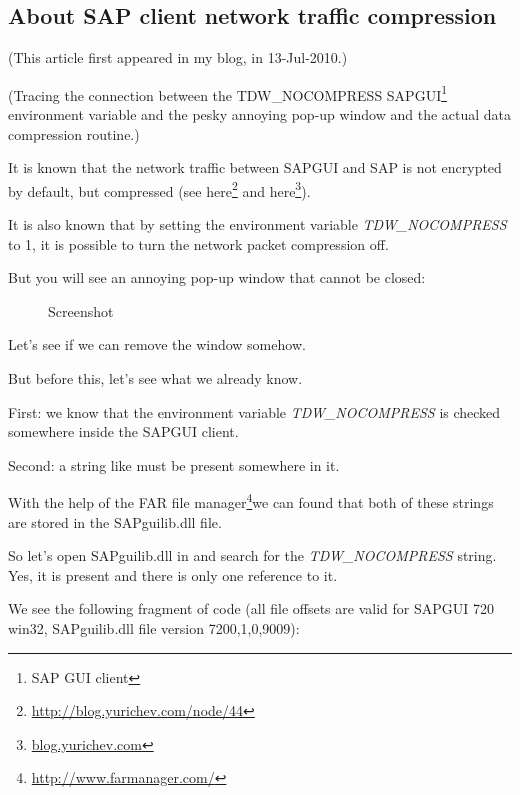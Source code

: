 \subsection{About SAP client network traffic compression}
\label{sec:SAPGUI}

(This article first appeared in my blog, in 13-Jul-2010.)

\newcommand{\TDWNC}{TDW\_NOCOMPRESS\xspace}

(Tracing the connection between the \TDWNC{}
SAPGUI\footnote{SAP GUI client} environment variable and 
the pesky annoying pop-up window and the actual data compression routine.)
 
It is known that the network traffic between SAPGUI and SAP is not encrypted by default, but compressed
(see here\footnote{\url{http://blog.yurichev.com/node/44}} 
and here\footnote{\href{http://blog.yurichev.com/node/47}{blog.yurichev.com}}). 

It is also known that by setting the environment variable \emph{\TDWNC} to 1, it is possible to turn the network packet compression off.

But you will see an annoying pop-up window that cannot be closed:

\begin{figure}[H]
\centering
{}
\caption{Screenshot}
\end{figure}

Let's see if we can remove the window somehow.

But before this, let's see what we already know.

First: we know that the environment variable \emph{\TDWNC} is checked somewhere inside the SAPGUI client.

Second: a string like  must be present somewhere in it.
\newcommand{\FNURLFAR}{\footnote{\url{http://www.farmanager.com/}}}

With the help of the FAR file manager\FNURLFAR we can found that both of these strings are stored in the SAPguilib.dll file.

So let's open SAPguilib.dll in \IDA and search for the \emph{\TDWNC} string. 
Yes, it is present and there is only one reference to it.

We see the following fragment of code 
(all file offsets are valid for SAPGUI 720 win32, SAPguilib.dll file version 7200,1,0,9009):



